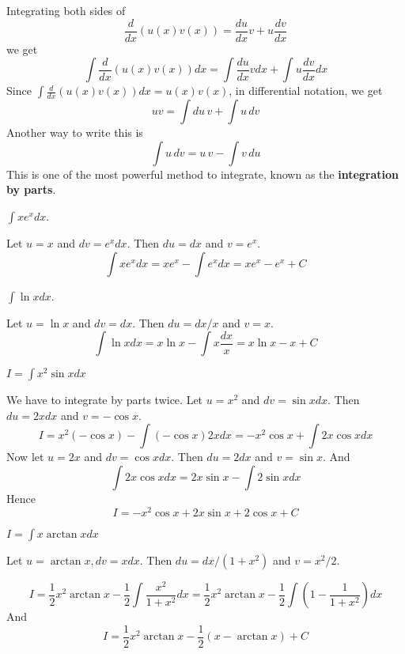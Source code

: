 \documentclass[calc1-main.tex]{subfiles}
\begin{document}
Integrating both sides of
\[
	\frac{d}{dx} (u(x) v(x)) = \frac{du}{dx} v + u \frac{dv}{dx}
\]
we get
\[
	\int \frac{d}{dx} (u(x) v(x)) dx = \int \frac{du}{dx} v dx + \int u \frac{dv}{dx} dx
\]
Since $\int \frac{d}{dx} (u(x) v(x)) dx = u(x) v(x)$, in differential notation, we get
\[
	u v = \int du \, v + \int u \, dv
\]
Another way to write this is
\[
	\int u \, dv = u\, v - \int v \, du
\]
This is one of the most powerful method to integrate, known as the \textbf{integration by parts}.

\begin{example}
	$\displaystyle \int x e^x dx$.
\end{example}
\begin{solution}
	Let $u = x$ and $dv = e^x dx$. Then $du = dx$ and $v = e^x$.
	\[
		\int x e^x dx = x e^x - \int e^x dx = x e^x - e^x + C
	\]
\end{solution}

\begin{example}
	$\displaystyle \int \ln x dx$.
\end{example}
\begin{solution}
	Let $u = \ln x$ and $dv = dx$. Then $du = dx/x$ and $v = x$.
	\[
		\int \ln x dx = x \ln x - \int x \frac{dx}{x} = x \ln x - x + C
	\]
\end{solution}

\begin{example}
	$I=\displaystyle \int x^2 \sin x dx$
\end{example}
\begin{solution}
	We have to integrate by parts twice. Let $u = x^2$ and $dv = \sin x dx$. Then $du = 2x dx$ and $v = -\cos x$.
	\[
		I = x^2 (-\cos x) - \int (-\cos x) 2x dx = - x^2 \cos x + \int 2x \cos x dx
	\]
	Now let $u = 2x$ and $dv = \cos x dx$. Then $du = 2 dx$ and $v = \sin x$. And
	\[
		\int 2x \cos x dx = 2x \sin x - \int 2 \sin x dx
	\]
	Hence
	\[
		I = -x^2 \cos x + 2x \sin x +2 \cos x + C
	\]
\end{solution}

\begin{example}
	$I = \displaystyle \int x \arctan x dx$
\end{example}
\begin{solution}
	Let $u=\arctan x, dv = x dx$. Then $du = dx/(1+x^2)$ and $v = x^2/2$.

	\[
		I = \frac{1}{2} x^2 \arctan x -\frac{1}{2} \int \frac{x^2}{1+x^2} dx
		= \frac{1}{2} x^2 \arctan x -\frac{1}{2} \int \left( 1- \frac{1}{1+x^2} \right) dx
	\]
	And
	\[
		I = \frac{1}{2} x^2 \arctan x - \frac{1}{2} (x - \arctan x) + C
	\]
\end{solution}
\end{document}
